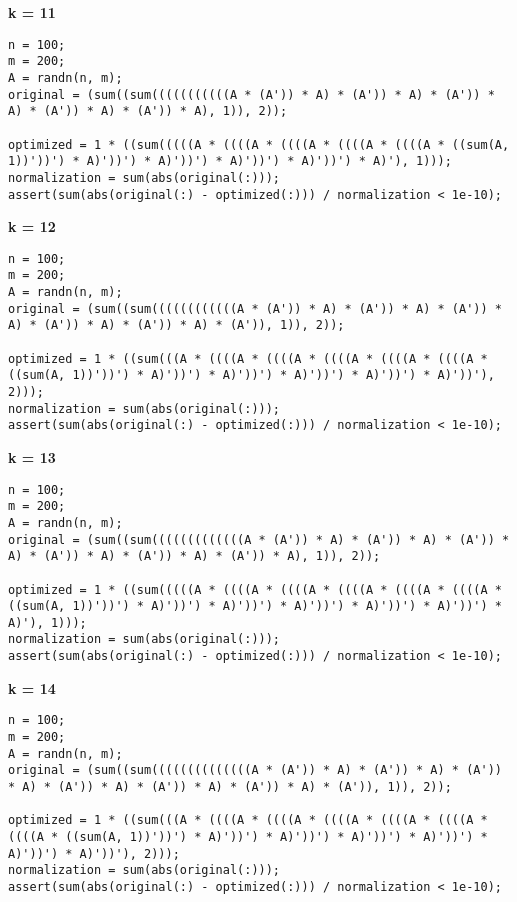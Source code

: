 {\bf k = 11}

\begin{lstlisting}
n = 100;
m = 200;
A = randn(n, m);
original = (sum((sum(((((((((((A * (A')) * A) * (A')) * A) * (A')) * A) * (A')) * A) * (A')) * A), 1)), 2));

optimized = 1 * ((sum(((((A * ((((A * ((((A * ((((A * ((((A * ((sum(A, 1))'))') * A)'))') * A)'))') * A)'))') * A)'))') * A)'), 1)));
normalization = sum(abs(original(:)));
assert(sum(abs(original(:) - optimized(:))) / normalization < 1e-10);
\end{lstlisting}


{\bf k = 12}

\begin{lstlisting}
n = 100;
m = 200;
A = randn(n, m);
original = (sum((sum((((((((((((A * (A')) * A) * (A')) * A) * (A')) * A) * (A')) * A) * (A')) * A) * (A')), 1)), 2));

optimized = 1 * ((sum(((A * ((((A * ((((A * ((((A * ((((A * ((((A * ((sum(A, 1))'))') * A)'))') * A)'))') * A)'))') * A)'))') * A)'))'), 2)));
normalization = sum(abs(original(:)));
assert(sum(abs(original(:) - optimized(:))) / normalization < 1e-10);
\end{lstlisting}


{\bf k = 13}

\begin{lstlisting}
n = 100;
m = 200;
A = randn(n, m);
original = (sum((sum(((((((((((((A * (A')) * A) * (A')) * A) * (A')) * A) * (A')) * A) * (A')) * A) * (A')) * A), 1)), 2));

optimized = 1 * ((sum(((((A * ((((A * ((((A * ((((A * ((((A * ((((A * ((sum(A, 1))'))') * A)'))') * A)'))') * A)'))') * A)'))') * A)'))') * A)'), 1)));
normalization = sum(abs(original(:)));
assert(sum(abs(original(:) - optimized(:))) / normalization < 1e-10);
\end{lstlisting}


{\bf k = 14}

\begin{lstlisting}
n = 100;
m = 200;
A = randn(n, m);
original = (sum((sum((((((((((((((A * (A')) * A) * (A')) * A) * (A')) * A) * (A')) * A) * (A')) * A) * (A')) * A) * (A')), 1)), 2));

optimized = 1 * ((sum(((A * ((((A * ((((A * ((((A * ((((A * ((((A * ((((A * ((sum(A, 1))'))') * A)'))') * A)'))') * A)'))') * A)'))') * A)'))') * A)'))'), 2)));
normalization = sum(abs(original(:)));
assert(sum(abs(original(:) - optimized(:))) / normalization < 1e-10);
\end{lstlisting}


